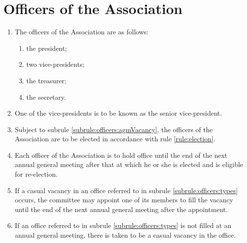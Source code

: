 \section{Officers of the Association}
\label{rule:officers}

\begin{enumerate}
	\item \label{subrule:officers:types} The officers of the Association are as follows:
	\begin{enumerate}
		\item the president;
		\item two vice-presidents;
		\item the treasurer;
		\item the secretary.
	\end{enumerate}
	
	\item One of the vice-presidents is to be known as the senior vice-president.
	\item Subject to subrule \ref{subrule:officers:agmVacancy}, the officers of the Association are to be elected in accordance with rule \ref{rule:election}.
	\item Each officer of the Association is to hold office until the end of the next annual general meeting after that at which he or she is elected and is eligible for re-election.
	\item \label{subrule:officers:casualVacancy} If a casual vacancy in an office referred to in subrule \ref{subrule:officers:types} occurs, the committee may appoint one of its members to fill the vacancy until the end of the next annual general meeting after the appointment.
	\item \label{subrule:officers:agmVacancy} If an office referred to in subrule \ref{subrule:officers:types} is not filled at an annual general meeting, there is taken to be a casual vacancy in the office.
\end{enumerate}